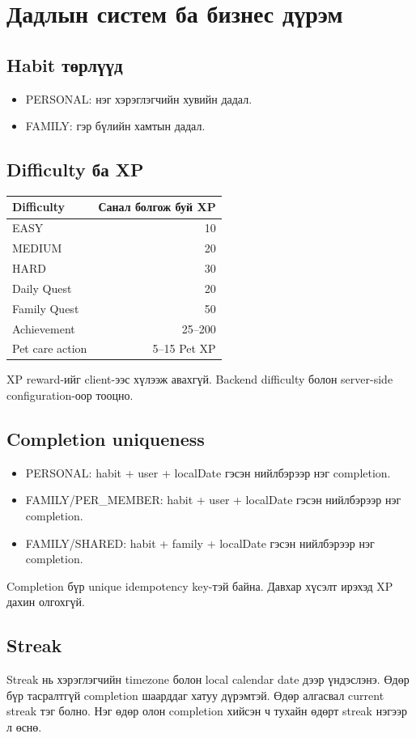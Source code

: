 \documentclass[12pt,a4paper,oneside]{report}
\begin{document}
\chapter{Дадлын систем ба бизнес дүрэм}

\section{Habit төрлүүд}
\begin{itemize}
  \item PERSONAL: нэг хэрэглэгчийн хувийн дадал.
  \item FAMILY: гэр бүлийн хамтын дадал.
\end{itemize}

\section{Difficulty ба XP}
\begin{longtable}{p{}r}
\toprule
\textbf{Difficulty} & \textbf{Санал болгож буй XP}\\
\midrule
EASY & 10\\
MEDIUM & 20\\
HARD & 30\\
Daily Quest & 20\\
Family Quest & 50\\
Achievement & 25--200\\
Pet care action & 5--15 Pet XP\\
\bottomrule
\end{longtable}
XP reward-ийг client-ээс хүлээж авахгүй. Backend difficulty болон server-side configuration-оор тооцно.

\section{Completion uniqueness}
\begin{itemize}
  \item PERSONAL: habit + user + localDate гэсэн нийлбэрээр нэг completion.
  \item FAMILY/PER\_MEMBER: habit + user + localDate гэсэн нийлбэрээр нэг completion.
  \item FAMILY/SHARED: habit + family + localDate гэсэн нийлбэрээр нэг completion.
\end{itemize}
Completion бүр unique idempotency key-тэй байна. Давхар хүсэлт ирэхэд XP дахин олгохгүй.

\section{Streak}
Streak нь хэрэглэгчийн timezone болон local calendar date дээр үндэслэнэ. Өдөр бүр тасралтгүй completion шаарддаг хатуу дүрэмтэй. Өдөр алгасвал current streak тэг болно. Нэг өдөр олон completion хийсэн ч тухайн өдөрт streak нэгээр л өснө.
\end{document}
